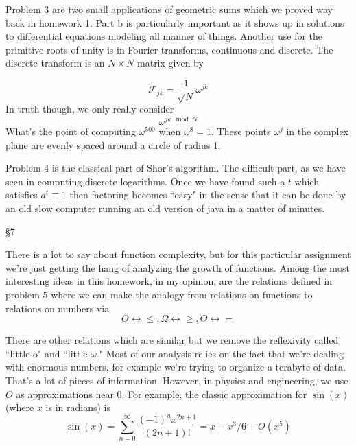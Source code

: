 \documentclass[16 pt]{amsart}
\theoremstyle{definition}
\theoremstyle{remark}
\numberwithin{equation}{subsection}
\begin{document}
Problem 3 are two small applications of geometric sums which we proved way back in homework 1.  Part b is particularly important as it shows up in solutions to differential equations modeling all manner of things.  Another use for the primitive roots of unity is in Fourier transforms, continuous and discrete.  The discrete transform is an $N\times N$ matrix given by

\[
\mathcal{F}_{jk} = \frac{1}{\sqrt{N}} \omega^{jk}
\]
In truth though, we only really consider
\[
\omega^{jk \mod{N}}
\]
What's the point of computing $\omega^{500}$ when $\omega^8 = 1$.  These points $\omega^j$ in the complex plane are evenly spaced around a circle of radius 1.\\  

\par Problem 4 is the classical part of Shor's algorithm.  The difficult part, as we have seen in computing discrete logarithms.  Once we have found such a $t$ which satisfies $a^t \equiv 1$ then factoring becomes ``easy" in the sense that it can be done by an old slow computer running an old version of java in a matter of minutes.


\S7

There is a lot to say about function complexity, but for this particular assignment we're just getting the hang of analyzing the growth of functions.  Among the most interesting ideas in this homework, in my opinion, are the relations defined in problem 5 where we can make the analogy from relations on functions to relations on numbers via
\[
O \leftrightarrow \le, \Omega \leftrightarrow \ge, \Theta \leftrightarrow =
\]

There are other relations which are similar but we remove the reflexivity called ``little-o" and ``little-$\omega$."  Most of our analysis relies on the fact that we're dealing with enormous numbers, for example we're trying to organize a terabyte of data.  That's a lot of pieces of information.  However, in physics and engineering, we use $O$ as approximations near 0.  For example, the classic approximation for $\sin(x)$ (where $x$ is in radians) is
\[
\sin(x) = \sum_{n=0}^{\infty} \frac{(-1)^n x^{2n+1}}{(2n+1)!} = x - x^3/6 + O(x^5) 
\]
\end{document}
